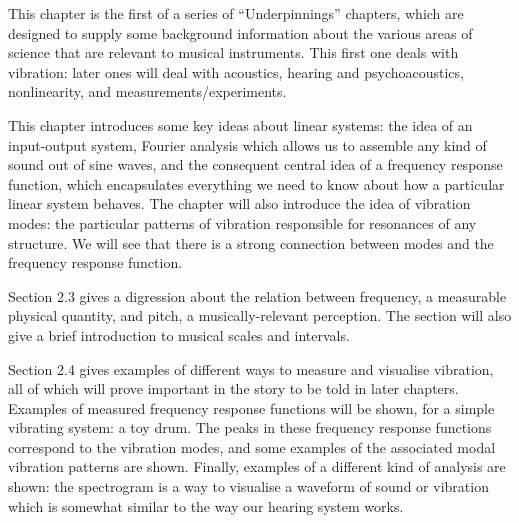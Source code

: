   This chapter is the first of a series of ``Underpinnings'' chapters, which 
  are designed to supply some background information about the various areas of 
  science that are relevant to musical instruments. This first one deals with 
  vibration: later ones will deal with acoustics, hearing and psychoacoustics, 
  nonlinearity, and measurements/experiments. 

  This chapter introduces some key ideas about linear systems: the idea of an 
  input-output system, Fourier analysis which allows us to assemble any kind of 
  sound out of sine waves, and the consequent central idea of a frequency 
  response function, which encapsulates everything we need to know about how a 
  particular linear system behaves. The chapter will also introduce the idea of 
  vibration modes: the particular patterns of vibration responsible for 
  resonances of any structure. We will see that there is a strong connection 
  between modes and the frequency response function. 

  Section 2.3 gives a digression about the relation between frequency, a 
  measurable physical quantity, and pitch, a musically-relevant perception. The 
  section will also give a brief introduction to musical scales and intervals. 

  Section 2.4 gives examples of different ways to measure and visualise 
  vibration, all of which will prove important in the story to be told in later 
  chapters. Examples of measured frequency response functions will be shown, 
  for a simple vibrating system: a toy drum. The peaks in these frequency 
  response functions correspond to the vibration modes, and some examples of 
  the associated modal vibration patterns are shown. Finally, examples of a 
  different kind of analysis are shown: the spectrogram is a way to visualise a 
  waveform of sound or vibration which is somewhat similar to the way our 
  hearing system works. 


